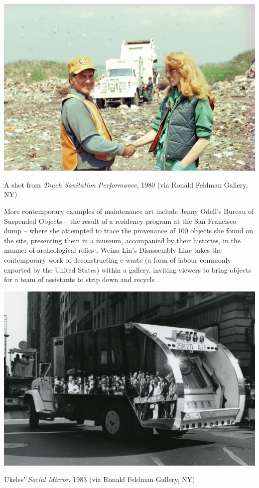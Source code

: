 \documentclass[nofonts,nols,justified,nobib]{tufte-book}
\begin{document}
\begin{marginfigure}
\includegraphics[width=\textwidth]{img/1/touch-sanitation.png}
\caption{A shot from \emph{Touch Sanitation Performance}, 1980 (via Ronald Feldman Gallery, NY)}
\end{marginfigure}

More contemporary examples of maintenance art include Jenny Odell's Bureau of Suspended Objects --  the result of a residency program at the San Francisco dump -- where she attempted to trace the provenance of 100 objects she found on the site, presenting them in a museum, accompanied by their histories, in the manner of archeological relics \cite{odell_archive_2015}. Weina Lin's Disassembly Line takes the contemporary work of deconstructing e-waste (a form of labour commonly exported by the United States) within a gallery, inviting viewers to bring objects for a team of assistants to strip down and recycle \cite{lin_disassembly_2016}.

\begin{marginfigure}
\includegraphics[width=\textwidth]{img/1/social-mirror.jpg}
\caption{Ukeles' \emph{Social Mirror}, 1983 (via Ronald Feldman Gallery, NY)}
\end{marginfigure}
\end{document}
